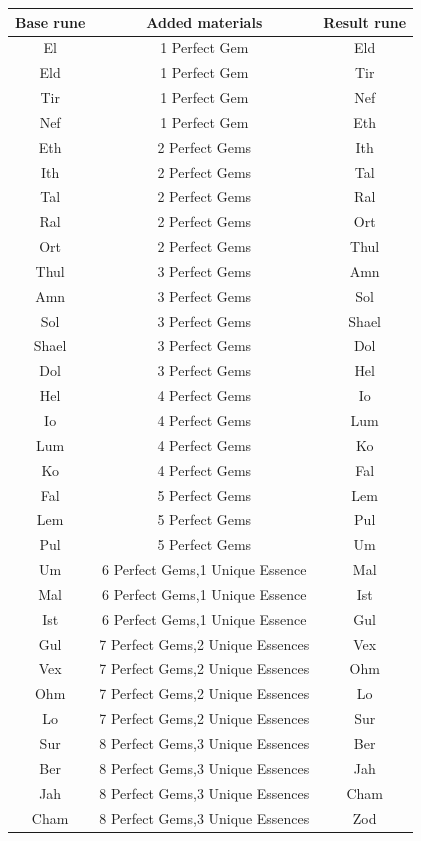 \documentclass[12pt,a4paper]{article}
\begin{document}
\begin{tabular}{|c|c|c|}
\hline
{\bf{Base rune}}&{\bf{Added materials}}&{\bf{Result rune}}\\
\hline
El&1 Perfect Gem&Eld\\
\hline
Eld&1 Perfect Gem&Tir\\
\hline
Tir&1 Perfect Gem&Nef\\
\hline
Nef&1 Perfect Gem&Eth\\
\hline
Eth&2 Perfect Gems&Ith\\
\hline
Ith&2 Perfect Gems&Tal\\
\hline
Tal&2 Perfect Gems&Ral\\
\hline
Ral&2 Perfect Gems&Ort\\
\hline
Ort&2 Perfect Gems&Thul\\
\hline
Thul&3 Perfect Gems&Amn\\
\hline
Amn&3 Perfect Gems&Sol\\
\hline
Sol&3 Perfect Gems&Shael\\
\hline
Shael&3 Perfect Gems&Dol\\
\hline
Dol&3 Perfect Gems&Hel\\
\hline
Hel&4 Perfect Gems&Io\\
\hline
Io&4 Perfect Gems&Lum\\
\hline
Lum&4 Perfect Gems&Ko\\
\hline
Ko&4 Perfect Gems&Fal\\
\hline
Fal&5 Perfect Gems&Lem\\
\hline
Lem&5 Perfect Gems&Pul\\
\hline
Pul&5 Perfect Gems&Um\\
\hline
Um&6 Perfect Gems,1 Unique Essence&Mal\\
\hline
Mal&6 Perfect Gems,1 Unique Essence&Ist\\
\hline
Ist&6 Perfect Gems,1 Unique Essence&Gul\\
\hline
Gul&7 Perfect Gems,2 Unique Essences&Vex\\
\hline
Vex&7 Perfect Gems,2 Unique Essences&Ohm\\
\hline
Ohm&7 Perfect Gems,2 Unique Essences&Lo\\
\hline
Lo&7 Perfect Gems,2 Unique Essences&Sur\\
\hline
Sur&8 Perfect Gems,3 Unique Essences&Ber\\
\hline
Ber&8 Perfect Gems,3 Unique Essences&Jah\\
\hline
Jah&8 Perfect Gems,3 Unique Essences&Cham\\
\hline
Cham&8 Perfect Gems,3 Unique Essences&Zod\\
\hline
\end{tabular}
\end{document}

